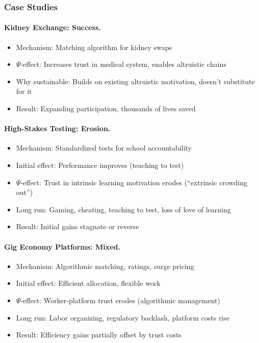 \subsubsection{Case Studies}

\paragraph{Kidney Exchange: Success.}
\begin{itemize}
  \item Mechanism: Matching algorithm for kidney swaps
  \item $\Psi$-effect: Increases trust in medical system, enables altruistic chains
  \item Why sustainable: Builds on existing altruistic motivation, doesn't substitute for it
  \item Result: Expanding participation, thousands of lives saved
\end{itemize}

\paragraph{High-Stakes Testing: Erosion.}
\begin{itemize}
  \item Mechanism: Standardized tests for school accountability
  \item Initial effect: Performance improves (teaching to test)
  \item $\Psi$-effect: Trust in intrinsic learning motivation erodes (``extrinsic crowding out'')
  \item Long run: Gaming, cheating, teaching to test, loss of love of learning
  \item Result: Initial gains stagnate or reverse
\end{itemize}

\paragraph{Gig Economy Platforms: Mixed.}
\begin{itemize}
  \item Mechanism: Algorithmic matching, ratings, surge pricing
  \item Initial effect: Efficient allocation, flexible work
  \item $\Psi$-effect: Worker-platform trust erodes (algorithmic management)
  \item Long run: Labor organizing, regulatory backlash, platform costs rise
  \item Result: Efficiency gains partially offset by trust costs
\end{itemize}

